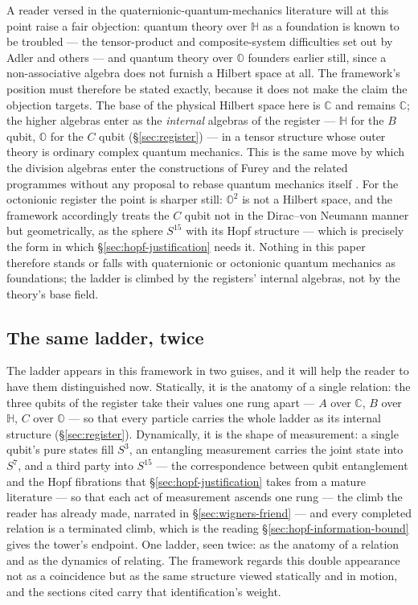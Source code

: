 A reader versed in the quaternionic-quantum-mechanics literature will at this point raise a fair
objection: quantum theory over $\mathbb{H}$ as a foundation is known to be troubled --- the
tensor-product and composite-system difficulties set out by Adler and others
\autocite{adler1995quaternionic} --- and quantum theory over $\mathbb{O}$ founders earlier still,
since a non-associative algebra does not furnish a Hilbert space at all. The framework's position
must therefore be stated exactly, because it does not make the claim the objection targets. The base
of the physical Hilbert space here is $\mathbb{C}$ and remains $\mathbb{C}$; the higher algebras
enter as the \emph{internal} algebras of the register --- $\mathbb{H}$ for the $B$ qubit,
$\mathbb{O}$ for the $C$ qubit (\S\ref{sec:register}) --- in a tensor structure whose outer theory is
ordinary complex quantum mechanics. This is the same move by which the division algebras enter the
constructions of Furey and the related programmes without any proposal to rebase quantum mechanics
itself \autocite{furey2018three}. For the octonionic register the point is sharper still:
$\mathbb{O}^{2}$ is not a Hilbert space, and the framework accordingly treats the $C$ qubit not in
the Dirac--von Neumann manner but geometrically, as the sphere $S^{15}$ with its Hopf structure ---
which is precisely the form in which \S\ref{sec:hopf-justification} needs it. Nothing in this paper therefore
stands or falls with quaternionic or octonionic quantum mechanics as foundations; the ladder is
climbed by the registers' internal algebras, not by the theory's base field.

\subsection{The same ladder, twice}

The ladder appears in this framework in two guises, and it will help the reader to have them
distinguished now. Statically, it is the anatomy of a single relation: the three qubits of the
register take their values one rung apart --- $A$ over $\mathbb{C}$, $B$ over $\mathbb{H}$, $C$ over
$\mathbb{O}$ --- so that every particle carries the whole ladder as its internal structure
(\S\ref{sec:register}). Dynamically, it is the shape of measurement: a single qubit's pure states
fill $S^{3}$, an entangling measurement carries the joint state into $S^{7}$, and a third party into
$S^{15}$ --- the correspondence between qubit entanglement and the Hopf fibrations that
\S\ref{sec:hopf-justification} takes from a mature literature --- so that each act of measurement ascends one rung --- the climb the reader has already made,
narrated in \S\ref{sec:wigners-friend} --- and every completed relation is a terminated climb, which is
the reading \S\ref{sec:hopf-information-bound} gives the tower's endpoint. One ladder, seen twice:
as the anatomy of a relation and as the dynamics of relating. The framework regards this double
appearance not as a coincidence but as the same structure viewed statically and in motion, and the
sections cited carry that identification's weight.

